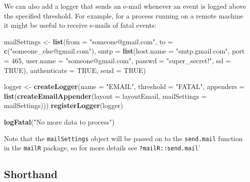 \documentclass[]{article}
\newenvironment{Shaded}{\begin{snugshade}}{\end{snugshade}}
\newcommand{\DataTypeTok}[1]{\textcolor[rgb]{0.13,0.29,0.53}{#1}}
\newcommand{\DecValTok}[1]{\textcolor[rgb]{0.00,0.00,0.81}{#1}}
\newcommand{\KeywordTok}[1]{\textcolor[rgb]{0.13,0.29,0.53}{\textbf{#1}}}
\newcommand{\NormalTok}[1]{#1}
\newcommand{\OtherTok}[1]{\textcolor[rgb]{0.56,0.35,0.01}{#1}}
\newcommand{\StringTok}[1]{\textcolor[rgb]{0.31,0.60,0.02}{#1}}
\begin{document}
We can also add a logger that sends an e-mail whenever an event is
logged above the specified threshold. For example, for a process running
on a remote machine it might be useful to receive e-mails of fatal
events:

\begin{Shaded}
\begin{Highlighting}[]
\NormalTok{mailSettings <-}\StringTok{ }\KeywordTok{list}\NormalTok{(}\DataTypeTok{from =} \StringTok{"someone@gmail.com"}\NormalTok{,}
                      \DataTypeTok{to =} \KeywordTok{c}\NormalTok{(}\StringTok{"someone_else@gmail.com"}\NormalTok{),}
                      \DataTypeTok{smtp =} \KeywordTok{list}\NormalTok{(}\DataTypeTok{host.name =} \StringTok{"smtp.gmail.com"}\NormalTok{,}
                                  \DataTypeTok{port =} \DecValTok{465}\NormalTok{,}
                                  \DataTypeTok{user.name =} \StringTok{"someone@gmail.com"}\NormalTok{,}
                                  \DataTypeTok{passwd =} \StringTok{"super_secret!"}\NormalTok{,}
                                  \DataTypeTok{ssl =} \OtherTok{TRUE}\NormalTok{),}
                      \DataTypeTok{authenticate =} \OtherTok{TRUE}\NormalTok{,}
                      \DataTypeTok{send =} \OtherTok{TRUE}\NormalTok{)}

\NormalTok{logger <-}\StringTok{ }\KeywordTok{createLogger}\NormalTok{(}\DataTypeTok{name =} \StringTok{"EMAIL"}\NormalTok{,}
                       \DataTypeTok{threshold =} \StringTok{"FATAL"}\NormalTok{,}
                       \DataTypeTok{appenders =} \KeywordTok{list}\NormalTok{(}\KeywordTok{createEmailAppender}\NormalTok{(}\DataTypeTok{layout =}\NormalTok{ layoutEmail,}
                                                            \DataTypeTok{mailSettings =}\NormalTok{ mailSettings)))}
\KeywordTok{registerLogger}\NormalTok{(logger)}

\KeywordTok{logFatal}\NormalTok{(}\StringTok{"No more data to process"}\NormalTok{)}
\end{Highlighting}
\end{Shaded}

Note that the \texttt{mailSettings} object will be passed on to the
\texttt{send.mail} function in the \texttt{mailR} package, so for more
details see \texttt{?mailR::send.mail}'

\hypertarget{shorthand-2}{%
\subsection{Shorthand}\label{shorthand-2}}
\end{document}
